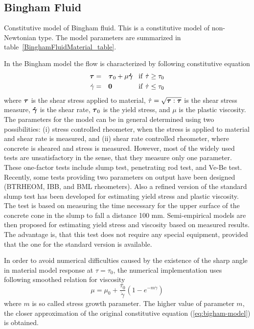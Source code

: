 \documentclass[epsf,a4paper]{article}
\newcommand{\mbf}[1]{\mbox{\boldmath$#1$}}
\newcommand{\del}[2]{\mbox{$\displaystyle\frac{#1}{#2}$}}
\begin{document}
\subsection{Bingham Fluid}
\label{BinghamFluidMaterial}
Constitutive model of Bingham fluid. This is a constitutive model of
non-Newtonian type. The model parameters are summarized
in table~\ref{BinghamFluidMaterial_table}.

In the Bingham model the flow is characterized by following
constitutive equation
\begin{eqnarray}
  \label{eq:bigham-model}
  \mbf{\tau}&=&\mbf{\tau}_0+\mu\mbf{\dot\gamma}\;\;\;\rm{if}\
  \dot\tau\ge\tau_0\\
  \dot\gamma &=& \mbf{0}\;\;\;\;\;\;\;\;\;\;\;\;\;\;\rm{if}\ \dot\tau\le\tau_0
\end{eqnarray}
where $\mbf{\tau}$ is the shear stress applied to material, $\dot\tau=\sqrt{\mbf{\tau}:\mbf{\tau}}$
is the shear stress measure, $\mbf{\dot\gamma}$ is
the shear rate, $\mbf{\tau}_0$ is the yield stress, and $\mu$ is the plastic
viscosity.
The parameters for the model can be in general determined using two
possibilities: (i) stress controlled rheometer, when the stress is applied
to material and shear rate is measured, and (ii) shear rate controlled
rheometer, where concrete is sheared and stress is measured. However,
most of the widely used tests are unsatisfactory in the sense, that
they measure only one parameter. These one-factor tests include slump
test, penetrating rod test, and Ve-Be test. Recently, some tests
providing two parameters on output have been designed (BTRHEOM, IBB,
and BML rheometers). Also a refined version of the
standard slump test has been developed for estimating yield stress and
plastic viscosity. The test is based on measuring the time necessary
for the upper surface of the concrete cone in the slump to fall a
distance 100 mm. Semi-empirical models are then proposed for estimating
yield stress and viscosity based on measured results. The advantage
is, that this test does not require any special equipment, provided that
the one for the standard version is available.

In order to avoid numerical difficulties caused by the existence of
the sharp angle in material model 
response at $\tau=\tau_0$, the numerical implementation uses
following smoothed relation for viscosity
\begin{equation}
\label{eq:smooth-bigham-model}
\mu=\mu_0+\del{\tau_0}{\dot\gamma}(1-e^{-m\dot\gamma})
\end{equation}
where $m$ is so called stress growth parameter. The higher value of
parameter $m$, the closer approximation of the original
constitutive equation (\ref{eq:bigham-model}) is obtained. 
%
%
\end{document}

